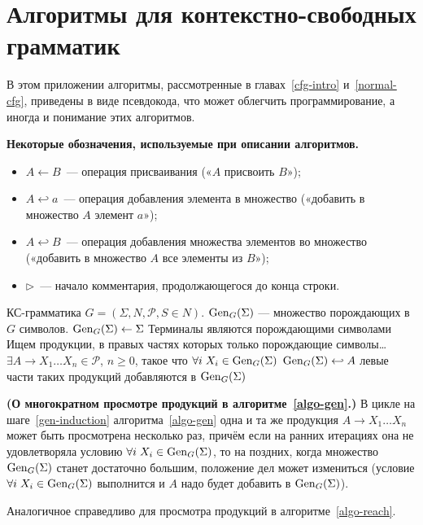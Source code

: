 \renewcommand{\theAlgoEnv}{\Alph{chapter}.\arabic{AlgoEnv}}

\chapter{Алгоритмы для контекстно-свободных грамматик}

В этом приложении алгоритмы, рассмотренные в
главах~\ref{cfg-intro} и~\ref{normal-cfg}, приведены в виде
псевдокода, что может облегчить программирование, а иногда и
понимание этих алгоритмов.

\textbf{Некоторые обозначения, используемые при описании алгоритмов.}
\begin{itemize}
    \item
${A \gets B}$~— операция присваивания («$A$ присвоить $B$»);

    \item
$A \hookleftarrow a$~— операция добавления элемента в множество («добавить в
множество $A$ элемент $a$»);

    \item
$A \hookleftarrow B$~— операция добавления
множества элементов во множество («добавить в множество $A$ все элементы из
$B$»);

    \item
${\rhd}$~— начало комментария, продолжающегося до конца строки.
\end{itemize}

{\label{algo-gen}КС-грамматика $G=(\Sigma, N, \mathcal P, S \in N)$.}
{$\operatorname{Gen}_G(\Sigma)$  — множество порождающих в $G$ символов.}
{%
\li $\operatorname{Gen}_G(\Sigma) \gets \Sigma$ \Comment Терминалы являются порождающими
символами
\zi\Comment Ищем продукции, в правых частях которых только порождающие символы\ldots
\li \While $\exists A \to X_1 \ldots X_n \in \mathcal P$, $n \geqslant 0$,
такое что $\forall i \; X_i \in \operatorname{Gen}_G(\Sigma)$  \label{gen-induction}
\zi     \Do
        $\operatorname{Gen}_G(\Sigma) \hookleftarrow A$ \Comment левые части таких
        продукций добавляются в $\operatorname{Gen}_G(\Sigma)$
        \End
}

\begin{myremark}
\textup{\textbf{(О многократном просмотре продукций в алгоритме~\ref{algo-gen}.)}}
В цикле на шаге~\ref{gen-induction} алгоритма~\ref{algo-gen}
одна и та же продукция $A \to X_1 \ldots X_n$
может быть просмотрена несколько раз, причём если на ранних итерациях она не
удовлетворяла условию $\forall i \; X_i \in \operatorname{Gen}_G(\Sigma)$, то на поздних,
когда множество $\operatorname{Gen}_G(\Sigma)$ станет достаточно большим, положение дел может
измениться (условие $\forall i \; X_i \in \operatorname{Gen}_G(\Sigma)$ выполнится и $A$ надо
будет добавить в $\operatorname{Gen}_G(\Sigma)$).

Аналогичное справедливо для просмотра продукций в алгоритме~\ref{algo-reach}.
\end{myremark}

